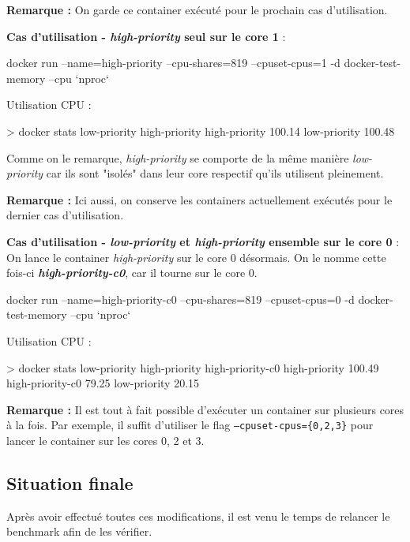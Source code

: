\documentclass[11pt,a4paper,oneside]{report}
\newcommand{\code}[1]{\texttt{#1}}
\begin{document}
\textbf{Remarque :} On garde ce container exécuté pour le prochain cas d'utilisation.

\textbf{Cas d'utilisation - \textit{high-priority} seul sur le core 1} :

\begin{textcode}
docker run --name=high-priority --cpu-shares=819 --cpuset-cpus=1 -d docker-test-memory --cpu `nproc`
\end{textcode}

Utilisation CPU :

\begin{textcode}
> docker stats low-priority high-priority
high-priority   100.14%
low-priority    100.48%
\end{textcode}

Comme on le remarque, \textit{high-priority} se comporte de la même manière \textit{low-priority} car ils sont "isolés" dans leur core respectif qu'ils utilisent pleinement.

\textbf{Remarque :} Ici aussi, on conserve les containers actuellement exécutés pour le dernier cas d'utilisation.

\textbf{Cas d'utilisation - \textit{low-priority} et \textit{high-priority} ensemble sur le core 0} :
On lance le container \textit{high-priority} sur le core 0 désormais. On le nomme cette fois-ci \textbf{\textit{high-priority-c0}}, car il tourne sur le core 0.

\begin{textcode}
docker run --name=high-priority-c0 --cpu-shares=819 --cpuset-cpus=0 -d docker-test-memory --cpu `nproc`
\end{textcode}

Utilisation CPU :
\begin{textcode}
> docker stats low-priority high-priority high-priority-c0
high-priority       100.49%
high-priority-c0    79.25%
low-priority        20.15%
\end{textcode}

\textbf{Remarque :} Il est tout à fait possible d'exécuter un container sur plusieurs cores à la fois. Par exemple, il suffit d'utiliser le flag \code{--cpuset-cpus=\{0,2,3\}} pour lancer le container sur les cores 0, 2 et 3.


\subsection{Situation finale}
Après avoir effectué toutes ces modifications, il est venu le temps de relancer le benchmark afin de les vérifier.
\end{document}
